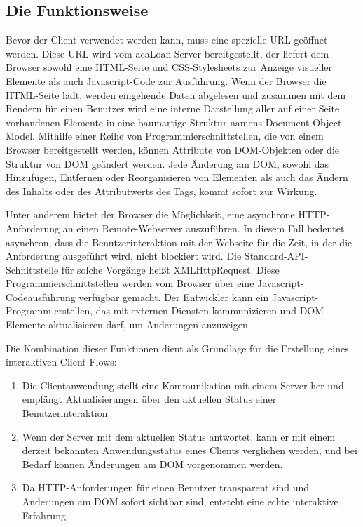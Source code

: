 \subsection{Die Funktionsweise}
\label{sec:display_client:funkt}
Bevor der Client verwendet werden kann, muss eine spezielle URL geöffnet werden. Diese URL wird vom acaLoan-Server bereitgestellt, der liefert dem Browser sowohl eine HTML-Seite und CSS-Stylesheets zur Anzeige visueller Elemente als auch Javascript-Code zur Ausführung. Wenn der Browser die HTML-Seite lädt, werden eingehende Daten abgelesen und zusammen mit dem Rendern für einen Benutzer wird eine interne Darstellung aller auf einer Seite vorhandenen Elemente in eine baumartige Struktur namens Document Object Model. Mithilfe einer Reihe von Programmierschnittstellen, die von einem Browser bereitgestellt werden, können Attribute von DOM-Objekten oder die Struktur von DOM geändert werden. Jede Änderung am DOM, sowohl das Hinzufügen, Entfernen oder Reorganisieren von Elementen als auch das Ändern des Inhalts oder des Attributwerts des Tags, kommt sofort zur Wirkung.

Unter anderem bietet der Browser die Möglichkeit, eine asynchrone HTTP-Anforderung an einen Remote-Webserver auszuführen. In diesem Fall bedeutet asynchron, dass die Benutzerinteraktion mit der Webseite für die Zeit, in der die Anforderung ausgeführt wird, nicht blockiert wird. Die Standard-API-Schnittstelle für solche Vorgänge heißt XMLHttpRequest. Diese Programmierschnittstellen werden vom Browser über eine Javascript-Codeausführung verfügbar gemacht. Der Entwickler kann ein Javascript-Programm erstellen, das mit externen Diensten kommunizieren und  DOM-Elemente aktualisieren darf, um Änderungen anzuzeigen.

Die Kombination dieser Funktionen dient als Grundlage für die Erstellung eines interaktiven Client-Flows:
\begin{enumerate}
	\item Die Clientanwendung stellt eine Kommunikation mit einem Server her und empfängt Aktualisierungen über den aktuellen Status einer Benutzerinteraktion
	\item Wenn der Server mit dem aktuellen Status antwortet, kann er mit einem derzeit bekannten Anwendungsstatus eines Clients verglichen werden, und bei Bedarf können Änderungen am DOM vorgenommen werden.
	\item Da HTTP-Anforderungen für einen Benutzer transparent sind und Änderungen am DOM sofort sichtbar sind, entsteht eine echte interaktive Erfahrung.
\end{enumerate}

